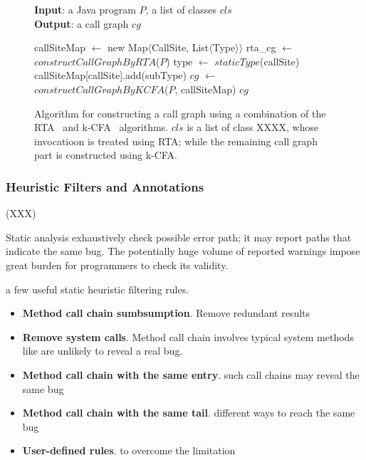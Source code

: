 \begin{figure}[t]
\textbf{Input}: a Java program $P$, a list of classes $cls$\\
\textbf{Output}: a call graph $cg$\\
\vspace{-5mm}
\begin{algorithmic}[1]
\STATE callSiteMap $\leftarrow$ new Map$\langle$CallSite, List$\langle$Type$\rangle$$\rangle$
\STATE rta\_cg $\leftarrow$ $constructCallGraphByRTA$($P$)
\STATE type $\leftarrow$ $staticType$(callSite)
\STATE callSiteMap[callSite].add(subType)
\ENDIF
\ENDFOR
\ENDIF
\ENDFOR
\ENDFOR
\STATE $cg$ $\leftarrow$ $constructCallGraphByKCFA$($P$, callSiteMap)
\RETURN $cg$
\vspace{-2mm}
\end{algorithmic}
\caption{Algorithm for constructing a call graph using a combination of the RTA~\cite{rta} and k-CFA~\cite{kcfa} algorithms.
$cls$ is a list of class XXXX, whose invocatioon is treated using RTA; while the remaining call graph
part is constructed using k-CFA.
} \label{fig:cgalgorithm}
\end{figure}




\subsubsection{Heuristic Filters and Annotations}
(XXX)

Static analysis exhaustively check possible error path; it may report
paths that indicate the same bug. The potentially huge volume of
reported warnings impose great burden for programmers to check
its validity. 

a few useful static heuristic filtering rules.

\begin{itemize}
\item \textbf{Method call chain sumbsumption}. Remove redundant
results

\item \textbf{Remove system calls}. Method call chain involves typical
system methods like  are unlikely to reveal a real bug.

\item \textbf{Method call chain with the same entry}. such
call chains may reveal the same bug

\item \textbf{Method call chain with the same tail}.  different ways
to reach the same bug

\item \textbf{User-defined rules}.  to overcome the limitation

\end{itemize}

